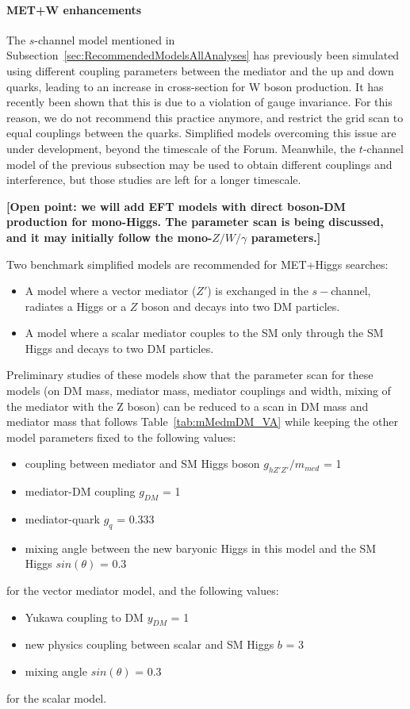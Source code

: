 \documentclass[a4,debug,notitlepage,nobib]{tufte-handout}
\begin{document}
\paragraph{MET+W enhancements} The $s$-channel model mentioned in
Subsection~\ref{sec:RecommendedModelsAllAnalyses} has previously been
simulated using different coupling parameters between the mediator and
the up and down quarks, leading to an increase in cross-section for W
boson production. It has recently been shown \cite{Bell:2015sza} that
this is due to a violation of gauge invariance. For this reason, we do
not recommend this practice anymore, and restrict the grid scan to
equal couplings between the quarks. Simplified models overcoming this
issue are under development, beyond the timescale of the Forum.
Meanwhile, the $t$-channel model of the previous subsection may be
used to obtain different couplings and interference, but those studies
are left for a longer timescale.


\textbf{[Open point: we will add EFT models with direct boson-DM production 
for mono-Higgs. The parameter scan is being discussed, and 
it may initially follow the mono-$Z/W/\gamma$ parameters.]}

Two benchmark simplified models \cite{Carpenter:2013xra} 
are recommended for MET+Higgs searches:
\begin{itemize}
 \item A model where a vector mediator ($Z'$) is exchanged in the $s-$channel, 
 radiates a Higgs or a $Z$ boson and decays into two DM particles. 
 \item A model where a scalar mediator couples to the SM only 
 through the SM Higgs and decays to two DM particles. 
\end{itemize}

Preliminary studies of these models show that the parameter scan for 
these models (on DM mass, mediator mass, mediator couplings and
width, mixing of the mediator with the Z boson) can be reduced to 
a scan in DM mass and mediator mass that follows Table~\ref{tab:mMedmDM_VA} while keeping 
the other model parameters fixed to the following values: 
\begin{itemize}
 \item coupling between mediator and SM Higgs boson $g_{hZ'Z'}/m_{med}$ = 1
 \item mediator-DM coupling $g_{DM}$ = 1
 \item mediator-quark $g_{q}$ = 0.333
 \item mixing angle between the new baryonic Higgs in this model and the SM Higgs $sin(\theta)$ = 0.3
\end{itemize}
for the vector mediator model, and the following values: 
\begin{itemize}
 \item Yukawa coupling to DM $y_{DM}$ = 1
 \item new physics coupling between scalar and SM Higgs $b$ = 3
 \item mixing angle $sin(\theta)$ = 0.3
\end{itemize}
for the scalar model. 
\end{document}
